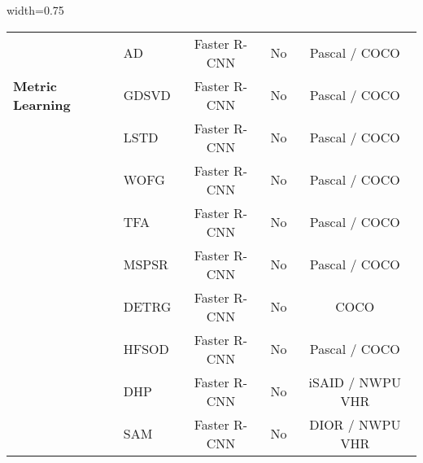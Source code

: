 \begin{table}[h]
\begin{adjustbox}{width=0.75\textwidth}
\begin{tabular}{@{}llccc}
            \cellcolor{white}                                                                    & AD \parencite{cao2021few}                         & Faster R-CNN               & No                          & Pascal / COCO                      \\
            \multirow{-6}{*}{\cellcolor{white}\parbox{1.5cm}{\textbf{Metric Learning}}}          & GDSVD \parencite{wu2021generalized}               & Faster R-CNN               & No                          & Pascal / COCO                      \\ \hline
            \cellcolor{white}                                                                    & LSTD  \parencite{chen2018lstd}                    & Faster R-CNN               & No                          & Pascal / COCO                      \\
            \cellcolor{white}                                                                    & WOFG  \parencite{fan2021generalized}              & Faster R-CNN               & No                          & Pascal / COCO                      \\
            \cellcolor{white}                                                                    & TFA   \parencite{wang2020frustratingly}           & Faster R-CNN               & No                          & Pascal / COCO                      \\
            \cellcolor{white}                                                                    & MSPSR \parencite{wu2020multi}                     & Faster R-CNN               & No                          & Pascal / COCO                      \\
            \cellcolor{white}                                                                    & DETRG \parencite{bar2022detreg}                   & Faster R-CNN               & No                          & COCO                               \\
            \cellcolor{white}                                                                    & HFSOD \parencite{zhang2021hallucination}          & Faster R-CNN               & No                          & Pascal / COCO                      \\
            \cellcolor{white}                                                                    & DHP \parencite{wolf2021double}                    & Faster R-CNN               & No                          & iSAID /  NWPU VHR                  \\
            \cellcolor{white}                                                                    & SAM \parencite{huang2021few}                      & Faster R-CNN               & No                          & DIOR / NWPU VHR                    \\

\end{tabular}
\end{adjustbox}
\end{table}
